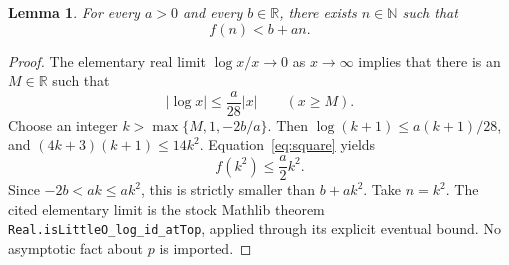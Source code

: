 \documentclass[11pt]{article}
\newtheorem{lemma}{Lemma}
\newcommand{\R}{\mathbb R}
\newcommand{\N}{\mathbb N}
\begin{document}
\begin{lemma}\label{lem:noaffine}
For every $a>0$ and every $b\in\R$, there exists $n\in\N$ such that
\[
f(n)<b+an.
\]
\end{lemma}
\begin{proof}
The elementary real limit $\log x/x\to0$ as $x\to\infty$ implies that there is an $M\in\R$ such that
\[
|\log x|\le\frac a{28}|x|\qquad(x\ge M).
\]
Choose an integer $k>\max\{M,1,-2b/a\}$. Then
$\log(k+1)\le a(k+1)/28$, and
$(4k+3)(k+1)\le14k^2$. Equation~\eqref{eq:square} yields
\[
f(k^2)\le\frac a2 k^2.
\]
Since $-2b<ak\le ak^2$, this is strictly smaller than $b+ak^2$. Take $n=k^2$.
The cited elementary limit is the stock Mathlib theorem
\texttt{Real.isLittleO\_log\_id\_atTop}, applied through its explicit eventual bound. No asymptotic fact about $p$ is imported.
\end{proof}
\end{document}
